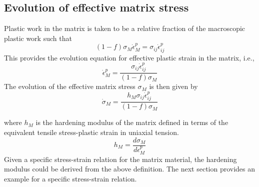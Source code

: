 \subsection{Evolution of effective matrix stress}
Plastic work in the matrix is taken to be a relative fraction of the
macroscopic plastic work such that
\begin{equation}\label{eq:plastic_work}
  (1-f)\sigma_M\dot{\epsilon}^p_M = \sigma_{ij}\dot{\epsilon}^p_{ij}
\end{equation}
This provides the evolution equation for effective plastic strain in the matrix, i.e., 
\begin{equation}\label{eq:epsMpdot}
  \dot{\epsilon}^p_M = \frac{\sigma_{ij}\dot{\epsilon}^p_{ij}}{(1-f)\sigma_M}
\end{equation}
The evolution of the effective matrix stress $\sigma_M$ is then given by
\begin{equation}\label{eq:sigMdot}
  \dot{\sigma}_M = \frac{h_M\sigma_{ij}\dot{\epsilon}^p_{ij}}{(1-f)\sigma_M}
\end{equation}

where $h_M$ is the hardening modulus of the matrix defined in terms of the equivalent tensile stress-plastic strain in uniaxial tension.
\begin{equation}\label{eq:hM_def}
 h_M = \frac{d\sigma_M}{d\epsilon^p_M}
\end{equation}
Given a specific stress-strain relation for the matrix material, the
hardening modulus could be derived from the above definition. The next
section provides an example for a specific stress-strain relation.


